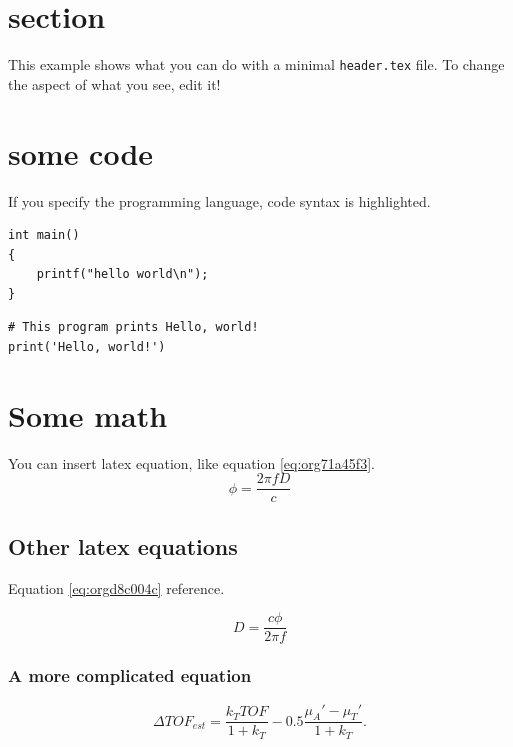 


\maketitle

\newpage

\section{section}
\label{sec:org2da3f80}
This example shows what you can do with a minimal \texttt{header.tex} file.
To change the aspect of what you see, edit it!

\section{some code}
\label{sec:org9c0addd}
If you specify the programming language, code syntax is highlighted.
\begin{verbatim}
int main()
{
    printf("hello world\n");
}
\end{verbatim}

\begin{verbatim}
# This program prints Hello, world!
print('Hello, world!')
\end{verbatim}

\section{Some math}
\label{sec:org6c33777}
You can insert latex equation, like equation \ref{eq:org71a45f3}.
\begin{equation}
\label{eq:org71a45f3}
\phi = \frac{2\pi fD}{c}
\end{equation}
\subsection{Other latex equations}
\label{sec:orgaba90d8}
Equation \ref{eq:orgd8c004c} reference.

\begin{equation}
\label{eq:orgd8c004c}
D = \frac{c\phi}{2\pi f}
\end{equation}

\subsubsection{A more complicated equation}
\label{sec:org23c0083}

\begin{equation}
\Delta TOF_{est} = \frac{k_T TOF}{1+k_T } - 0.5 \frac{\mu_A' - \mu_T'}{1+k_T}.
\end{equation}

